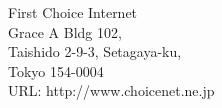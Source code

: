 \vspace{0.3cm}
First Choice Internet \\
Grace A Bldg 102, \\
Taishido 2-9-3, Setagaya-ku, \\
Tokyo 154-0004 \\

URL: http://www.choicenet.ne.jp \\
